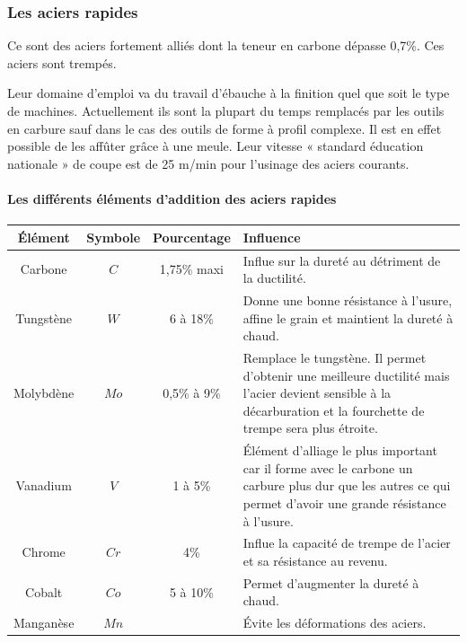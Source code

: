 \documentclass[11pt,oneside]{article}
\begin{document}
\subsubsection{Les aciers rapides}
Ce sont des aciers fortement alliés dont la teneur en carbone dépasse 0,7\%. Ces aciers sont trempés. 

Leur domaine d'emploi va du travail d'ébauche à la finition quel que soit le type de machines. Actuellement ils sont la plupart du temps remplacés par les outils en carbure sauf dans le cas des outils de forme à profil complexe. Il est en effet possible de les affûter grâce à une meule. Leur vitesse « standard éducation nationale » de coupe est de 25 m/min pour l'usinage des aciers courants.

\paragraph*{Les différents éléments d'addition des aciers rapides}

\begin{center}
\begin{tabular}{|c|c|c|p{}|}
\hline
Élément & Symbole & Pourcentage & Influence \\ \hline
Carbone & $C$& 1,75\% maxi & Influe sur la dureté au détriment de la ductilité.\\ \hline
Tungstène & $W$ & 6 à 18\% & Donne une bonne résistance à l'usure, affine le grain et maintient la dureté à chaud.\\ \hline
Molybdène & $Mo$ & 0,5\% à 9\% & Remplace le tungstène. Il permet d'obtenir une meilleure ductilité mais l'acier devient sensible à la décarburation et la fourchette de trempe sera plus étroite. \\ \hline
Vanadium & $V$ & 1 à 5\% & Élément d'alliage le plus important car il forme avec le carbone un carbure plus dur que les autres ce qui permet d'avoir une grande résistance à l'usure. \\ \hline
Chrome & $Cr$ & 4\%  & Influe la capacité de trempe de l'acier et sa résistance au revenu.\\ \hline
Cobalt  & $Co$ & 5 à 10\% & Permet d'augmenter la dureté à chaud.\\ \hline
Manganèse & $Mn$& & Évite les déformations des aciers.\\ \hline
\end{tabular}
\end{center}
\end{document}
